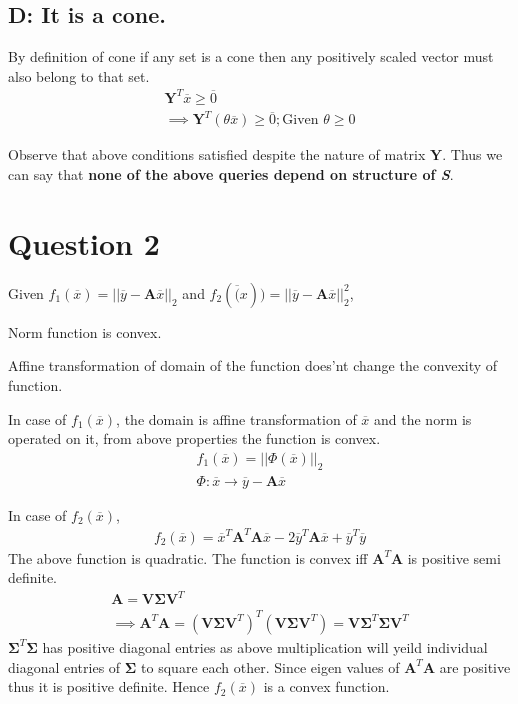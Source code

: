 \documentclass{article}
\begin{document}
\subsection*{D: It is a cone.}
By definition of cone if any set is a cone then any positively scaled vector must also belong to that set.\\
\begin{gather*}
	\mathbf{Y}^T\overline{x} \ge \overline{0}\\
	\implies \mathbf{Y}^T(\theta \overline{x}) \ge \overline{0}; \text{Given } \theta \ge 0
\end{gather*}

Observe that above conditions satisfied despite the nature of matrix $\mathbf{Y}$. Thus we can say that \textbf{none of the above queries depend on structure of \textit{S}}.

\section*{\hfil Question 2}
Given $f_1(\overline{x}) = ||\overline{y}-\mathbf{A}\overline{x}||_2$ and $f_2(\overline(x)) = ||\overline{y}-\mathbf{A}\overline{x}||_2^2$,\\
\begin{list}{•}{\textbf{Useful properties}}
	\item Norm function is convex.
	\item Affine transformation of domain of the function does'nt change the convexity of function.
\end{list}

In case of $f_1(\overline{x})$, the domain is affine transformation of $\overline{x}$ and the norm is operated on it, from above properties the function is convex.\\
\begin{gather*}
	f_1(\overline{x}) = ||\Phi(\overline{x})||_2\\
	\Phi: \overline{x} \rightarrow \overline{y}-\mathbf{A}\overline{x}
\end{gather*}

In case of $f_2(\overline{x})$,
\begin{gather*}
	f_2(\overline{x}) = \overline{x}^T\mathbf{A}^T\mathbf{A}\overline{x} - 2\overline{y}^T\mathbf{A}\overline{x} + \overline{y}^T\overline{y}
\end{gather*}
The above function is quadratic. The function is convex iff $\mathbf{A}^T\mathbf{A}$ is positive semi definite.
\begin{gather*}
	\mathbf{A} = \mathbf{V}\mathbf{\Sigma}\mathbf{V}^T\\
	\implies \mathbf{A}^T\mathbf{A} = (\mathbf{V}\mathbf{\Sigma}\mathbf{V}^T)^T(\mathbf{V}\mathbf{\Sigma}\mathbf{V}^T) = \mathbf{V}\mathbf{\Sigma}^T\mathbf{\Sigma}\mathbf{V}^T
\end{gather*}
$\mathbf{\Sigma}^T\mathbf{\Sigma}$ has positive diagonal entries as above multiplication will yeild individual diagonal entries of $\mathbf{\Sigma}$ to square each other. Since eigen values of $\mathbf{A}^T\mathbf{A}$ are positive thus it is positive definite. Hence $f_2(\overline{x})$ is a convex function.
\end{document}
